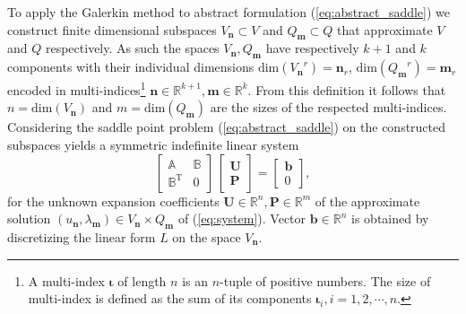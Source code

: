 \documentclass{marine_2015}
\newcommand{\Uvec}{\ensuremath{\mathbf{U}}}
\newcommand{\Pvec}{\ensuremath{\mathbf{P}}}
\newcommand{\Vh}{\ensuremath{V_{\mathbf{n}}}}
\newcommand{\Qh}{\ensuremath{Q_{\mathbf{m}}}}
\begin{document}
To apply the Galerkin method to abstract formulation (\ref{eq:abstract_saddle}) we 
construct finite dimensional subspaces $\Vh\subset V$ and $\Qh\subset Q$ that 
approximate $V$ and $Q$ respectively. As such the spaces $\Vh, \Qh$ have respectively 
$k+1$ and $k$ components with their individual dimensions
$\text{dim}\left(\Vh^r\right)=\mathbf{n}_r$, $\text{dim}\left(\Qh^r\right)=\mathbf{m}_r$ 
encoded in multi-indices\footnote{A multi-index $\mathbf{\iota}$ of length $n$
is an $n$-tuple of positive numbers. The size of multi-index is defined as the
sum of its components $\mathbf{\iota}_i, i=1, 2, \cdots, n$.} $\mathbf{n}\in\mathbb{R}^{k+1}, \mathbf{m}\in\mathbb{R}^k$.
From this definition it follows that $n=\text{dim}\left(\Vh\right)$ and $m=\text{dim}\left(\Qh\right)$
are the sizes of the respected multi-indices. Considering the saddle point
problem (\ref{eq:abstract_saddle}) on the constructed subspaces yields a symmetric
indefinite linear system
\begin{equation}
  \label{eq:sysAB}
    \begin{bmatrix}
      \mathbb{A} & \mathbb{B} \\
      \mathbb{B}^{\text{T}} & 0
    \end{bmatrix}
    \,
    \begin{bmatrix}
      \mathbf{U} \\
      \mathbf{P}
    \end{bmatrix}
    =
    \begin{bmatrix}
      \mathbf{b}\\
      0
    \end{bmatrix},
\end{equation}
for the unknown expansion coefficients $\Uvec\in\mathbb{R}^n,
\Pvec\in\mathbb{R}^m$ of the approximate solution
$\left(u_\mathbf{n}, \lambda_{\mathbf{m}}\right)\in \Vh \times \Qh$ of
(\ref{eq:system}). Vector $\mathbf{b}\in\mathbb{R}^n$ is obtained by
discretizing the linear form $L$ on the space $\Vh$.
\end{document}
